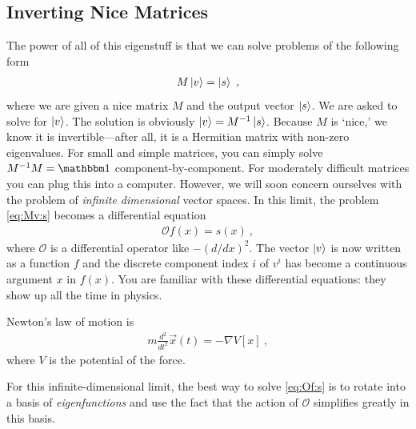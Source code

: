 \documentclass[12pt, oneside]{report}    %
\begin{document}
\subsection{Inverting Nice Matrices}
\label{sec:inverting:nice:matrices}

The power of all of this eigenstuff is that we can solve problems of the following form
\begin{align}
    M \left|v\right\rangle = \left|s\right\rangle \ ,
    \label{eq:Mv:s}
\end{align}
where we are given a nice matrix $M$ and the output vector $\left|s\right\rangle$. We are asked to solve for $\left|v\right\rangle$. The solution is obviously $\left|v\right\rangle = M^{-1} \left|s\right\rangle$. Because $M$ is `nice,' we know it is invertible---after all, it is a Hermitian matrix with non-zero eigenvalues. For small and simple matrices, you can simply solve $M\inv M = \one$ component-by-component. For moderately difficult matrices you can plug this into a computer. However, we will soon concern ourselves with the problem of \emph{infinite dimensional} vector spaces. In this limit, the problem \eqref{eq:Mv:s} becomes a differential equation 
\begin{align}
    \mathcal O f(x) = s(x) \ ,
    \label{eq:Of:s}
\end{align}
where $\mathcal O$ is a differential operator like $-(d/dx)^2$. The vector $\left|v\right\rangle$ is now written as a function $f$ and the discrete component index $i$ of $v^i$ has become a continuous argument $x$ in $f(x)$. You are familiar with these differential equations: they show up all the time in physics. 
\begin{example}
Newton's law of motion is
\begin{align}
    m\frac{d^2}{dt^2} \vec{x}(t) = -\nabla V[x] \ ,
\end{align}
where $V$ is the potential of the force. 
\end{example}
For this infinite-dimensional limit, the best way to solve \eqref{eq:Of:s} is to rotate into a basis of \emph{eigenfunctions} and use the fact that the action of $\mathcal O$ simplifies greatly in this basis.
\end{document}
